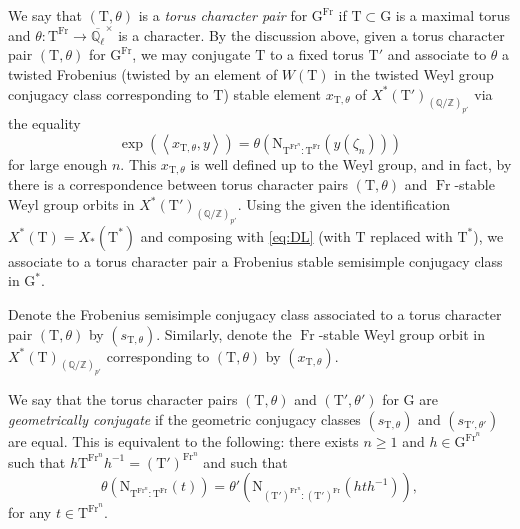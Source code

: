\documentclass[12pt, reqno]{amsart}
\theoremstyle{definition}
\theoremstyle{definition}
\theoremstyle{definition}
\newcommand{\multiplicativegroup}[1]{#1^{\times}}
\newcommand{\innerproduct}[2]{\left\langle #1,#2\right\rangle}
\newcommand{\aFieldNorm}{\mathrm{N}}
\newcommand{\algebraicClosure}[1]{\overline{#1}}
\newcommand{\Frobenius}{\operatorname{Fr}}
\newcommand{\ladicnumbers}{\algebraicClosure{\mathbb{Q}_{\ell}}}
\newcommand{\algebraicGroup}[1]{\boldsymbol{\mathrm{#1}}}
\newcommand{\CharacterLattice}[1]{X^{\ast}\left(#1\right)}
\newcommand{\CocharacterLattice}[1]{X_{\ast}\left(#1\right)}
\begin{document}
We say that $(\algebraicGroup{T},\theta)$ is a \emph{torus character pair} for $\algebraicGroup{G}^{\Frobenius}$ if $\algebraicGroup{T} \subset \algebraicGroup{G}$ is a maximal torus and $\theta \colon \algebraicGroup{T}^{\Frobenius} \to \multiplicativegroup{\ladicnumbers}$ is a character. By the discussion above, given a torus character pair  $(\algebraicGroup{T},\theta)$ for $\algebraicGroup{G}^{\Frobenius}$, we may conjugate $\algebraicGroup{T}$ to a fixed torus $\algebraicGroup{T}'$ and associate to $\theta$ a twisted Frobenius (twisted by an element of $W\left(\algebraicGroup{T}\right)$ in the twisted Weyl group conjugacy class corresponding to $\algebraicGroup{T}$) stable element $x_{\algebraicGroup{T},\theta}$ of $\CharacterLattice{\algebraicGroup{T}'}_{(\mathbb{Q}/\mathbb{Z})_{p'}}$ via the equality
\[
\exp(\innerproduct{x_{\algebraicGroup{T},\theta}}{y}) = \theta(\aFieldNorm_{\algebraicGroup{T}^{\Frobenius^n}:\algebraicGroup{T}^{\Frobenius}}(y(\zeta_n)))
\]
for large enough $n$. This $x_{\algebraicGroup{T},\theta}$ is well defined up to the Weyl group, and in fact, by \cite[Corollary 13.9]{DigneMichel1991} there is a correspondence between torus character pairs $(\algebraicGroup{T},\theta)$ and $\Frobenius$-stable Weyl group orbits in $\CharacterLattice{\algebraicGroup{T}'}_{(\mathbb{Q}/\mathbb{Z})_{p'}}$.  Using the given the identification $\CharacterLattice{\algebraicGroup{T}} = \CocharacterLattice{\algebraicGroup{T}^{\ast}}$ and composing with \eqref{eq:DL} (with $\algebraicGroup{T}$ replaced with $\algebraicGroup{T}^{\ast}$), we associate to a torus character pair a Frobenius stable semisimple conjugacy class in $\algebraicGroup{G}^*$.

Denote the Frobenius semisimple conjugacy class associated to a torus character pair $(\algebraicGroup{T},\theta)$ by $(s_{\algebraicGroup{T},\theta})$. Similarly, denote the $\Frobenius$-stable Weyl group orbit in $\CharacterLattice{\algebraicGroup{T}}_{(\mathbb{Q}/\mathbb{Z})_{p'}}$ corresponding to $(\algebraicGroup{T},\theta)$ by $(x_{\algebraicGroup{T},\theta}).$

We say that the torus character pairs $(\algebraicGroup{T},\theta)$ and $(\algebraicGroup{T}',\theta')$ for $\algebraicGroup{G}$ are \emph{geometrically conjugate} if the geometric conjugacy classes $(s_{\algebraicGroup{T},\theta})$ and $(s_{\algebraicGroup{T}',\theta'})$ are equal. This is equivalent to the following: there exists $n \ge 1$ and $h \in {\algebraicGroup{G}}^{\Frobenius^n}$ such that $h \algebraicGroup{T}^{\Frobenius^n} h^{-1} = \left(\algebraicGroup{T}'\right)^{\Frobenius^n}$ and such that $$\theta\left(\aFieldNorm_{\algebraicGroup{T}^{\Frobenius^n}:\algebraicGroup{T}^{\Frobenius}}\left(t\right)\right) = \theta'\left(\aFieldNorm_{\left(\algebraicGroup{T}'\right)^{\Frobenius^n}:\left(\algebraicGroup{T}'\right)^{\Frobenius}}\left(h t h^{-1}\right)\right),$$ for any $t \in \algebraicGroup{T}^{\Frobenius^n}$.
\end{document}
